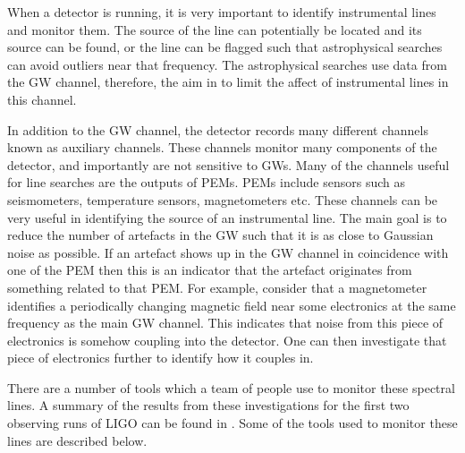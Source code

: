 When a detector is running, it is very important to identify instrumental lines
and monitor them.  The source of the line can potentially be located and its source can be found, or the line can be flagged such that astrophysical searches can avoid outliers near that frequency.  
The astrophysical searches use data from the \gls{GW} channel, therefore, the aim in to limit the affect of instrumental lines in this channel.

%
In addition to the \gls{GW} channel, the detector
records many different channels known as auxiliary channels.  These channels
monitor many components of the detector, and importantly are not sensitive to
\glspl{GW}.  Many of the channels useful for line searches are the outputs of \glspl{PEM}.
\glspl{PEM} include sensors such as seismometers, temperature sensors,
magnetometers etc.  These channels can be very useful in identifying the source
of an instrumental line.  The main goal is to reduce the number of artefacts in
the \gls{GW} such that it is as close to Gaussian noise as possible.  If an
artefact shows up in the \gls{GW} channel in coincidence with one of the
\gls{PEM} then this is an indicator that the artefact originates from something
related to that \gls{PEM}.  For example, consider
that a magnetometer identifies a periodically changing magnetic field near some electronics  at the same frequency as
the main \gls{GW} channel.  This indicates that noise from this piece of
electronics is somehow coupling into the detector.  One can then investigate
that piece of electronics further to identify how it couples in.

%

There are a number of tools which a team of people use to monitor these spectral lines.
A summary of the results from these investigations for the first two observing runs of \gls{LIGO} can be found in
\citep{covas2018IdentificationMitigation}.  Some of the tools used to monitor these lines are
described below.

